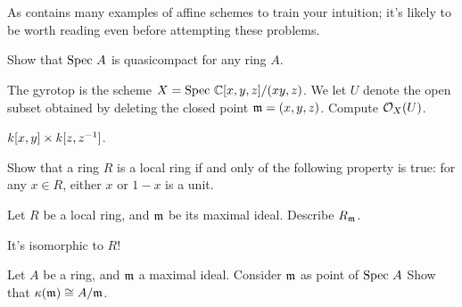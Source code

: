 \section{\problemhead}
As  contains many
examples of affine schemes to train your intuition;
it's likely to be worth reading even before attempting these problems.

\begin{dproblem}
	\gim
	Show that $\text{Spec } A$ is quasicompact for any ring $A$.
\end{dproblem}

\begin{problem}
	The gyrotop is the scheme $X = \text{Spec } \mathbb C[x,y,z] / (xy,z)$.
	We let $U$ denote the open subset obtained
	by deleting the closed point $\mathfrak m = (x,y,z)$.
	Compute $\mathcal O_X(U)$.
	\begin{hint}
		$k[x,y] \times k[z,z^{-1}]$.
	\end{hint}
\end{problem}

\begin{problem}
	Show that a ring $R$ is a local ring
	if and only of the following property is true:
	for any $x \in R$,
	either $x$ or $1-x$ is a unit.
\end{problem}

\begin{problem}
	Let $R$ be a local ring, and $\mathfrak m$ be its maximal ideal.
	Describe $R_\mathfrak m$.
	\begin{hint}
		It's isomorphic to $R$!
	\end{hint}
\end{problem}

\begin{problem}
	Let $A$ be a ring, and $\mathfrak m$ a maximal ideal.
	Consider $\mathfrak m$ as point of $\text{Spec } A$
	Show that $\kappa(\mathfrak m) \cong A/\mathfrak m$.
\end{problem}


